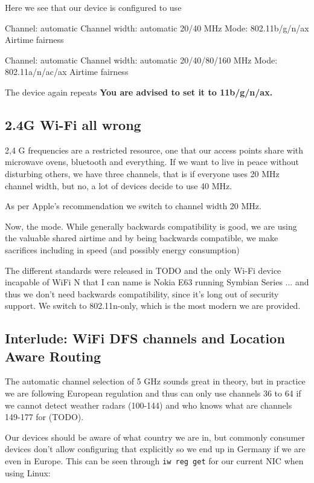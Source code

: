 \documentclass[../wifi-security.tex]{subfiles}
\begin{document}
Here we see that our device is configured to use

Channel: automatic
Channel width: automatic 20/40 MHz
Mode: 802.11b/g/n/ax
Airtime fairness

Channel: automatic
Channel width: automatic 20/40/80/160 MHz
Mode: 802.11a/n/ac/ax
Airtime fairness

The device again repeats \textbf{You are advised to set it to 11b/g/n/ax.}

\subsection{2.4G Wi-Fi all wrong}

2,4 G frequencies are a restricted resource, one that our access points share with microwave ovens, bluetooth and everything. If we want to live in peace without disturbing others, we have three channels, that is if everyone uses 20 MHz channel width, but no, a lot of devices decide to use 40 MHz.

As per Apple's recommendation we switch to channel width 20 MHz. %

Now, the mode. While generally backwards compatibility is good, we are using the valuable shared airtime and by being backwards compatible, we make sacrifices including in speed (and possibly energy consumption) %

The different standards were released in TODO and the only Wi-Fi device incapable of WiFi N that I can name is Nokia E63 running Symbian Series ... and thus we don't need backwards compatibility, since it's long out of security support. We switch to 802.11n-only, which is the most modern we are provided.

\subsection{Interlude: WiFi DFS channels and Location Aware Routing}

The automatic channel selection of 5 GHz sounds great in theory, but in practice we are following European regulation and thus can only use channels 36 to 64 if we cannot detect weather radars (100-144) and who knows what are channels 149-177 for (TODO).

Our devices should be aware of what country we are in, but commonly consumer devices don't allow configuring that explicitly so we end up in Germany if we are even in Europe. This can be seen through \texttt{iw reg get} for our current NIC when using Linux:
\end{document}
